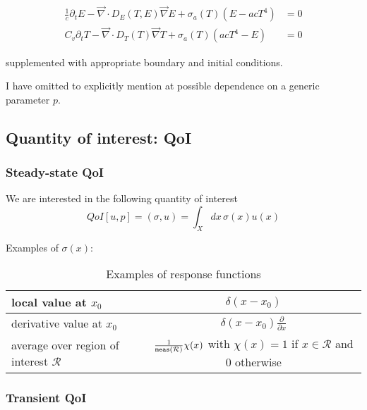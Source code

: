 \documentclass[11pt]{article}
\renewcommand{\div}{\vec{\nabla}\! \cdot \!}
\newcommand{\grad}{\vec{\nabla}}
\newcommand{\be}{\begin{equation}}
\newcommand{\ee}{\end{equation}}
\begin{document}
\begin{align}
\frac{1}{c} \partial_t E - \div D_E(T,E) \grad E + \sigma_a(T)(E-acT^4) &= 0 \\
C_v \partial_t T -\div D_T(T) \grad T +\sigma_a(T)(acT^4-E)            &= 0
\end{align}

supplemented with appropriate boundary and initial conditions.

I have omitted to explicitly mention at possible dependence on a generic parameter $p$.

\subsection{Quantity of interest: QoI}

\subsubsection{Steady-state QoI}

We are interested in the following quantity of interest
\be
QoI[u,p] = (\sigma, u) = \int_X  dx \, \sigma(x)u(x)
\ee

Examples of $\sigma(x)$:
\begin{table*}[!h]
	
	\begin{center}
		\begin{tabular}{|l||c|}
		\hline
	local value at $x_0$ & $\delta(x-x_0)$ \\ \hline
	derivative value at $x_0$ & $\delta(x-x_0) \frac{\partial}{\partial x}$ \\ \hline
	average over region of interest $\mathcal{R}$ & $\frac{1}{\tt{meas}(\mathcal{R})} \chi(x)$ with $\chi(x)=1$ if $x\in\mathcal{R}$ and 0 otherwise \\ \hline
		\end{tabular}
	\end{center}
	\caption{Examples of response functions}
	\label{tab:ExamplesOfResponseFunctions}
\end{table*}

\subsubsection{Transient QoI}
\end{document}
